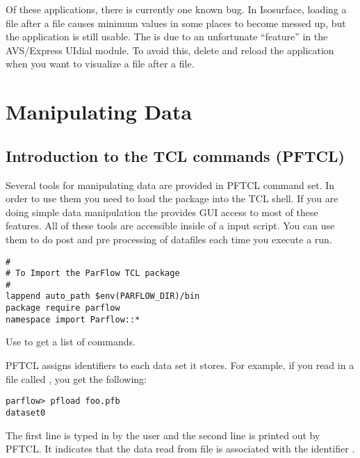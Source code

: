 Of these applications, there is currently one known bug.  In Isosurface,
loading a  file after a  file causes minimum values in
some places to become messed up, but the application is still usable.  The is
due to an unfortunate ``feature'' in the AVS/Express UIdial module.  To avoid
this, delete and reload the application when you want to visualize a
 file after a  file.


\section{Manipulating Data}
\label{Manipulating Data}

\subsection{Introduction to the \parflow{} TCL commands (PFTCL) }

Several tools for manipulating data are provided in PFTCL command set.
In order to use them you need to load the \parflow{} package into
the TCL shell.  If you are doing simple data manipulation the
 provides GUI access to most of these features.
All of these tools are accessible inside of a \parflow{} input script.
You can use them to do post and pre processing of datafiles each time
you execute a run.

\begin{display}\begin{verbatim}
#
# To Import the ParFlow TCL package
#
lappend auto_path $env(PARFLOW_DIR)/bin 
package require parflow
namespace import Parflow::*
\end{verbatim}\end{display}

Use  to get a list of commands.

PFTCL assigns identifiers to each data set it stores.
For example, if you read in a file called ,
you get the following:
\begin{display}\begin{verbatim}
parflow> pfload foo.pfb
dataset0
\end{verbatim}\end{display}
The first line is typed in by the user and the second line
is printed out by PFTCL.
It indicates that the data read from file  is
associated with the identifier .

